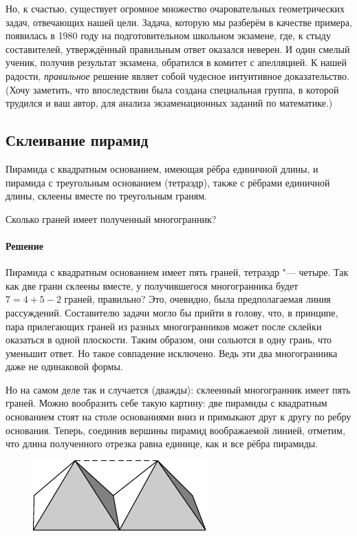 \documentclass[twoside]{book}
\makeatletter
\newcommand{\rindex}[2][\imki@jobname]{%
  \index[#1]{\detokenize{#2}}%
}
\makeatother
\begin{document}
Но, к счастью, существует огромное множество очаровательных геометрических задач, отвечающих нашей цели. 
Задача, которую мы разберём в качестве примера, появилась в 1980 году на подготовительном  школьном экзамене, %
где, к стыду составителей, %
утверждённый правильным ответ оказался неверен.
И один смелый ученик, получив результат экзамена, обратился в комитет с апелляцией.
К нашей радости, \emph{правильное} решение являет собой  чудесное интуитивное доказательство.
(Хочу заметить, что впоследствии была создана специальная группа, в которой  трудился и ваш автор, для анализа экзаменационных заданий по математике.)

\subsection*{Склеивание пирамид}%
\rindex{Склеивание пирамид}

Пирамида с квадратным основанием, имеющая рёбра единичной длины, и пирамида с треугольным основанием (тетраэдр), также с рёбрами единичной длины, склеены вместе по треугольным граням.

Сколько граней имеет полученный многогранник?

\paragraph{Решение}

Пирамида с квадратным основанием имеет пять граней, тетраэдр "--- четыре.
Так как две грани склеены вместе, у получившегося многогранника будет $7=4+5-2$ граней, правильно?
Это, очевидно, была предполагаемая линия рассуждений.
Составителю задачи могло бы прийти в голову, что, в принципе, пара прилегающих граней из разных многогранников может после склейки оказаться в одной плоскости.
Таким образом, они сольются в одну грань, что уменьшит ответ.
Но  такое совпадение исключено.
Ведь эти два многогранника даже не одинаковой формы.

Но на самом деле так и случается (дважды):
склеенный многогранник имеет пять граней.
Можно вообразить себе такую картину: две пирамиды с квадратным основанием стоят на столе основаниями вниз 
и примыкают друг к другу по ребру основания.
Теперь, соединив вершины пирамид воображаемой линией, отметим, что длина полученного отрезка равна единице, как и все рёбра пирамиды. 

\begin{figure}[!ht]
\centering
\includegraphics{mp/wink-6}
\end{figure}
\end{document}
